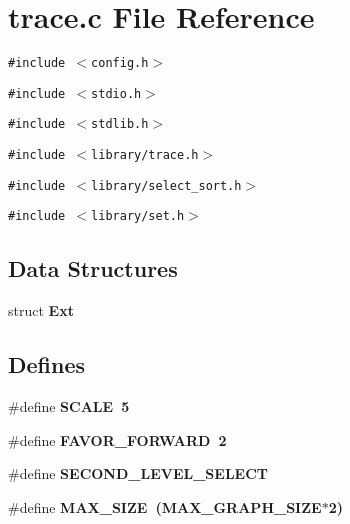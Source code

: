 \section{trace.c File Reference}
\label{trace_8c}
{\tt \#include $<$config.h$>$}\par
{\tt \#include $<$stdio.h$>$}\par
{\tt \#include $<$stdlib.h$>$}\par
{\tt \#include $<$library/trace.h$>$}\par
{\tt \#include $<$library/select\_\-sort.h$>$}\par
{\tt \#include $<$library/set.h$>$}\par
\subsection*{Data Structures}
\begin{CompactItemize}
\item 
struct \bf{Ext}
\end{CompactItemize}
\subsection*{Defines}
\begin{CompactItemize}
\item 
\#define \bf{SCALE}~5
\item 
\#define \bf{FAVOR\_\-FORWARD}~2
\item 
\#define \bf{SECOND\_\-LEVEL\_\-SELECT}
\item 
\#define \bf{MAX\_\-SIZE}~(MAX\_\-GRAPH\_\-SIZE$\ast$2)
\end{CompactItemize}
